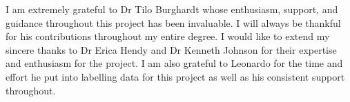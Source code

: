 I am extremely grateful to Dr Tilo Burghardt whose enthusiasm, support, and guidance throughout this project has been invaluable. I will always be thankful for his contributions throughout my entire degree. I would like to extend my sincere thanks to Dr Erica Hendy and Dr Kenneth Johnson for their expertise and enthusiasm for the project. I am also grateful to Leonardo for the time and effort he put into labelling data for this project as well as his consistent support throughout.